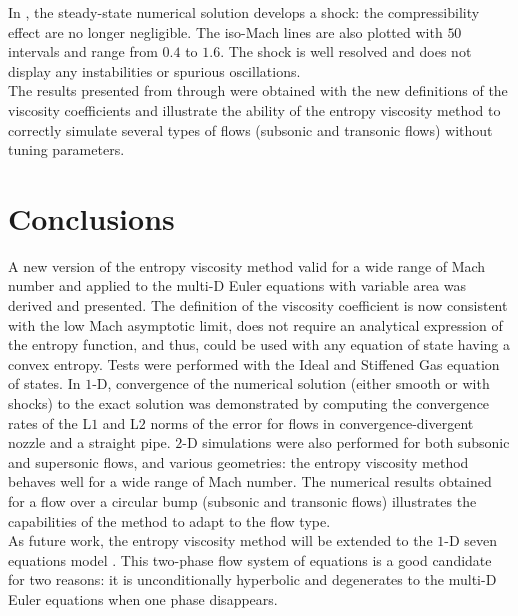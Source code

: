 In , the steady-state numerical solution develops a shock: the compressibility effect are no longer negligible. The iso-Mach lines are also plotted with $50$ intervals and range from $0.4$ to $1.6$. The shock is well resolved and does not display any instabilities or spurious oscillations. \\
The results presented from  through  were obtained with the new definitions of the viscosity coefficients and illustrate the ability of the entropy viscosity method to correctly simulate several types of flows (subsonic and transonic flows) without tuning parameters.
\section{Conclusions} \label{sec:ccl_sct3}
A new version of the entropy viscosity method valid for a wide range of Mach number and applied to the multi-D Euler equations with variable area was derived and presented. The definition of the viscosity coefficient is now consistent with the low Mach asymptotic limit, does not require an analytical expression of the entropy function, and thus, could be used with any equation of state having a convex entropy. Tests were performed with the Ideal and Stiffened Gas equation of states. In $1$-D, convergence of the numerical solution (either smooth or with shocks) to the exact solution was demonstrated by computing the convergence rates of the L$1$ and L$2$ norms of the error for flows in convergence-divergent nozzle and a straight pipe. $2$-D simulations were also performed for both subsonic and supersonic flows, and various geometries: the entropy viscosity method behaves well for a wide range of Mach number. The numerical results obtained for a flow over a circular bump (subsonic and transonic flows) illustrates the capabilities of the method to adapt to the flow type. \\
As future work, the entropy viscosity method will be extended to the $1$-D seven equations model \cite{SEM}. This two-phase flow system of equations is a good candidate for two reasons: it is unconditionally hyperbolic and degenerates to the multi-D Euler equations when one phase disappears.